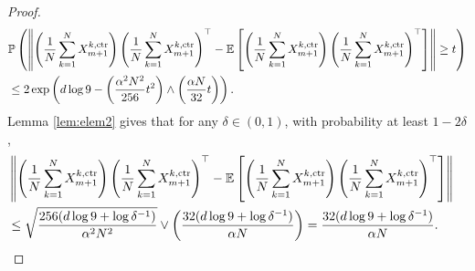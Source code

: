 \documentclass[12pt,reqno]{amsart}
\theoremstyle{remark}
\theoremstyle{definition}
\newcommand{\E}{\mathbb{E}}
\renewcommand{\Pr}{\mathbb{P}}
\newcommand{\ctr}{\textnormal{ctr}}
\begin{document}
\begin{proof}
\begin{align*}
        &\Pr\left(\left\|\left(\frac{1}{N}\sum_{k=1}^{N}X_{m+1}^{k,\ctr}\right)\left(\frac{1}{N}\sum_{k=1}^{N}X_{m+1}^{k,\ctr}\right)^{\top}-\E\left[\left(\frac{1}{N}\sum_{k=1}^{N}X_{m+1}^{k,\ctr}\right)\left(\frac{1}{N}\sum_{k=1}^{N}X_{m+1}^{k,\ctr}\right)^{\top}\right]\right\|\ge t\right)\\
        &\le 2\exp\left(d\log 9-\left(\frac{\alpha^{2}N^{2}}{256}t^{2}\right)\wedge \left(\frac{\alpha N}{32}t\right)\right).
    \end{align*}
    Lemma \ref{lem:elem2} gives that for any $\delta\in(0,1)$, with probability at least $1-2\delta$,
    \begin{align*}
        &\left\|\left(\frac{1}{N}\sum_{k=1}^{N}X_{m+1}^{k,\ctr}\right)\left(\frac{1}{N}\sum_{k=1}^{N}X_{m+1}^{k,\ctr}\right)^{\top}-\E\left[\left(\frac{1}{N}\sum_{k=1}^{N}X_{m+1}^{k,\ctr}\right)\left(\frac{1}{N}\sum_{k=1}^{N}X_{m+1}^{k,\ctr}\right)^{\top}\right]\right\|&\\
        &\le \sqrt{\frac{256(d\log9+\log\delta^{-1})}{\alpha^{2}N^{2}}}\vee \left(\frac{32(d\log9+\log\delta^{-1})}{\alpha N}\right)=\frac{32(d\log9+\log\delta^{-1})}{\alpha N}.
    \end{align*}


\end{proof}
\end{document}
